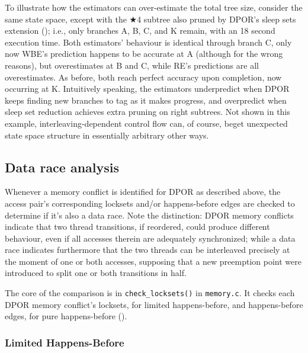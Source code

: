 To illustrate how the estimators can over-estimate the total tree size,
consider the same state space,
except with the $\bigstar$4 subtree also pruned by DPOR's sleep sets extension (\sect{\ref{sec:landslide-sleepsets}});
i.e., only branches A, B, C, and K remain,
with an 18 second execution time.
Both estimators' behaviour is identical through branch C,
only now WBE's prediction happens to be accurate at A (although for the wrong reasons),
but overestimates at B and C,
while RE's predictions are all overestimates.
As before, both reach perfect accuracy upon completion, now occurring at K.
Intuitively speaking, the estimators underpredict when DPOR keeps finding new branches to tag as it makes progress,
and overpredict when sleep set reduction achieves extra pruning on right subtrees.
Not shown in this example, interleaving-dependent control flow can, of course,
beget unexpected state space structure in essentially arbitrary other ways.


\subsection{Data race analysis}
\label{sec:landslide-datarace}

Whenever a memory conflict is identified for DPOR as described above,
the access pair's corresponding locksets and/or happens-before edges are checked to determine if it's also a data race.
Note the distinction: DPOR memory conflicts indicate that two thread transitions,
if reordered, could produce different behaviour, even if all accesses therein are adequately synchronized;
while a data race indicates furthermore that the two threads can be interleaved precisely at the moment of one or both accesses,
supposing that a new preemption point were introduced to split one or both transitions in half.

The core of the comparison is in {\tt check\_locksets()} in {\tt memory.c}.
It checks each DPOR memory conflict's locksets, for limited happens-before,
and happens-before edges, for pure happens-before
(\sect{\ref{sec:background-hb}}).

\subsubsection{Limited Happens-Before}
\label{sec:landslide-lhb}

